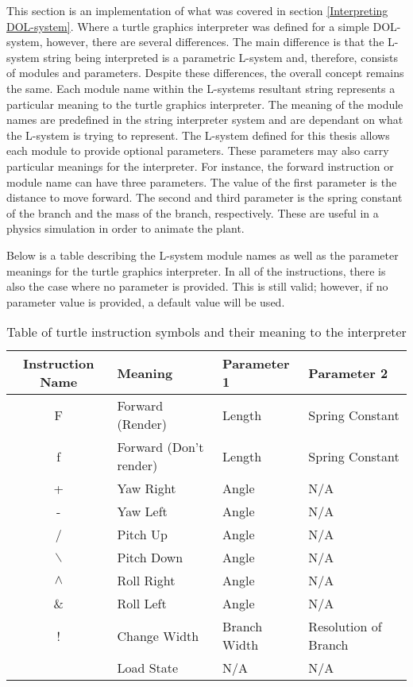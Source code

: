 This section is an implementation of what was covered in section \ref{Interpreting DOL-system}. Where a turtle graphics interpreter was defined for a simple DOL-system, however, there are several differences. The main difference is that the L-system string being interpreted is a parametric L-system and, therefore, consists of modules and parameters. Despite these differences, the overall concept remains the same. Each module name within the L-systems resultant string represents a particular meaning to the turtle graphics interpreter. The meaning of the module names are predefined in the string interpreter system and are dependant on what the L-system is trying to represent. The L-system defined for this thesis allows each module to provide optional parameters. These parameters may also carry particular meanings for the interpreter. For instance, the forward instruction or module name  can have three parameters. The value of the first parameter is the distance to move forward. The second and third parameter is the spring constant of the branch and the mass of the branch, respectively. These are useful in a physics simulation in order to animate the plant. 

Below is a table describing the L-system module names as well as the parameter meanings for the turtle graphics interpreter. In all of the instructions, there is also the case where no parameter is provided. This is still valid; however, if no parameter value is provided, a default value will be used.

\begin{table}[h!]
\centering
\begin{tabular}{ | c | l | l | l |}
\hline
	Instruction Name  & Meaning					& Parameter 1 	& Parameter 2 					\\  
\hline
\hline
	F 				&	Forward (Render)		& Length		& Spring Constant				\\
\hline
	f 				&	Forward (Don't render)	& Length 		& Spring Constant				\\
\hline
	+ 				&	Yaw	Right				& Angle 		&	N/A							\\
\hline
	- 				&	Yaw Left				& Angle			&	N/A							\\
\hline
	/ 				&	Pitch Up				& Angle			&	N/A							\\
\hline
	$\backslash$ 	&	Pitch Down				& Angle			&	N/A							\\
\hline
	$\land$ 		&	Roll Right				& Angle			&	N/A							\\
\hline
	\& 				&	Roll Left				& Angle 		&	N/A							\\
\hline
	! 				&	Change Width			& Branch Width	&	Resolution of Branch		\\
\hline
	[ 				&	Save State				& N/A			&	N/A							\\
\hline
	] 				&	Load State				& N/A 			&	N/A							\\
\hline
\end{tabular}
\caption{Table of turtle instruction symbols and their meaning to the interpreter}
\label{instruction table 1}
\end{table}
\FloatBarrier

